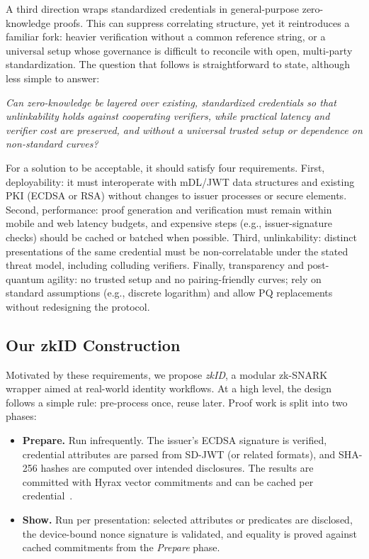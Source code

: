 A third direction wraps standardized credentials in general-purpose zero-knowledge proofs. This can suppress correlating structure, yet it reintroduces a familiar fork: heavier verification without a common reference string, or a universal setup whose governance is difficult to reconcile with open, multi-party standardization. The question that follows is straightforward to state, although less simple to answer:
\begin{center}
    \textit{Can zero-knowledge be layered over existing, standardized credentials so that unlinkability holds against cooperating verifiers, while practical latency and verifier cost are preserved, and without a universal trusted setup or dependence on non-standard curves?}
\end{center}

For a solution to be acceptable, it should satisfy four requirements. First, deployability: it must interoperate with mDL/JWT data structures and existing PKI (ECDSA or RSA) without changes to issuer processes or secure elements. Second, performance: proof generation and verification must remain within mobile and web latency budgets, and expensive steps (e.g., issuer-signature checks) should be cached or batched when possible. Third, unlinkability: distinct presentations of the same credential must be non-correlatable under the stated threat model, including colluding verifiers. Finally, transparency and post-quantum agility: no trusted setup and no pairing-friendly curves; rely on standard assumptions (e.g., discrete logarithm) and allow PQ replacements without redesigning the protocol.

\subsection{Our zkID Construction}

Motivated by these requirements, we propose \emph{zkID}, a modular zk-SNARK wrapper aimed at real-world identity workflows. At a high level, the design follows a simple rule: pre-process once, reuse later. Proof work is split into two phases:
\begin{itemize}
    \item \textbf{Prepare.} Run infrequently. The issuer’s ECDSA signature is verified, credential attributes are parsed from SD-JWT (or related formats), and SHA-256 hashes are computed over intended disclosures. The results are committed with Hyrax vector commitments and can be cached per credential~\cite{cryptoeprint:2017/1132}.
    \item \textbf{Show.} Run per presentation: selected attributes or predicates are disclosed, the device-bound nonce signature is validated, and equality is proved against cached commitments from the \emph{Prepare} phase.
\end{itemize}

